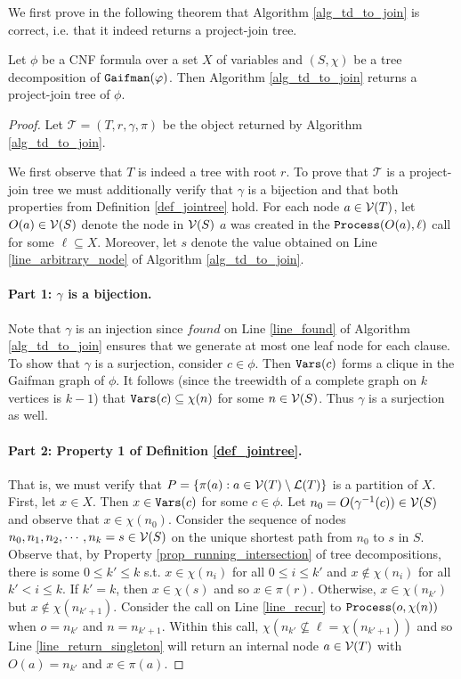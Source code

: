 We first prove in the following theorem that Algorithm \ref{alg_td_to_join} is correct, i.e. that it indeed returns a project-join tree. 
\begin{theorem}
\label{thm_td_to_join_correct}
	Let $\phi$ be a CNF formula over a set $X$ of variables and $(S, \chi)$ be a tree decomposition of $\texttt{\upshape Gaifman}(\varphi)$.
    Then Algorithm \ref{alg_td_to_join} returns a project-join tree of $\phi$.
\end{theorem}
\begin{proof}
Let $\mathcal{T} = (T, r, \gamma, \pi)$ be the object returned by Algorithm \ref{alg_td_to_join}.

We first observe that $T$ is indeed a tree with root $r$. To prove that $\mathcal{T}$ is a project-join tree we must additionally verify that $\gamma$ is a bijection and that both properties from Definition \ref{def_jointree} hold.  For each node $a \in \mathcal{V}(T)$, let $O(a) \in \mathcal{V}(S)$ denote the node in $\mathcal{V}(S)$ \st{} $a$ was created in the $\texttt{\upshape Process}(O(a), \ell)$ call for some $\ell \subseteq X$. Moreover, let $s$ denote the value obtained on Line \ref{line_arbitrary_node} of Algorithm \ref{alg_td_to_join}.

\paragraph{Part 1: $\gamma$ is a bijection.}
    Note that $\gamma$ is an injection since $found$ on Line \ref{line_found} of Algorithm \ref{alg_td_to_join} ensures that we generate at most one leaf node for each clause.
    To show that $\gamma$ is a surjection, consider $c \in \phi$.
    Then $\texttt{\upshape Vars}(c)$ forms a clique in the Gaifman graph of $\phi$.
    It follows (since the treewidth of a complete graph on $k$ vertices is $k-1$) that $\texttt{\upshape Vars}(c) \subseteq \chi(n)$ for some $n \in \mathcal{V}(S)$.
    Thus $\gamma$ is a surjection as well.
    
\paragraph{Part 2: Property 1 of Definition \ref{def_jointree}.} 
    That is, we must verify that $P = \{\pi(a) : a \in \mathcal{V}(T) \setminus \mathcal{L}(T) \}$ is a partition of $X$.
    First, let $x \in X$.
    Then $x \in \texttt{\upshape Vars}(c)$ for some $c \in \phi$. 
    Let $n_0 = O(\gamma^{-1}(c)) \in \mathcal{V}(S)$ and observe that $x \in \chi(n_0)$.
    Consider the sequence of nodes $n_0, n_1, n_2, \cdots, n_k = s \in \mathcal{V}(S)$ on the unique shortest path from $n_0$ to $s$ in $S$.
    Observe that, by Property \ref{prop_running_intersection} of tree decompositions, there is some $0 \leq k' \leq k$ s.t. $x \in \chi(n_i)$ for all $0 \leq i \leq k'$ and $x \not \in \chi(n_i)$ for all $k' < i \leq k$.
    If $k' = k$, then $x \in \chi(s)$ and so $x \in \pi(r)$.
    Otherwise,  $x \in \chi(n_{k'})$ but $x \not\in \chi(n_{k'+1})$.
    Consider the call on Line \ref{line_recur} to $\texttt{\upshape Process}(o, \chi(n))$ when $o = n_{k'}$ and $n = n_{k'+1}$.
    Within this call, $\chi(n_{k'} \not\subseteq \ell = \chi(n_{k'+1}))$ and so Line \ref{line_return_singleton} will return an internal node $a \in \mathcal{V}(T)$ with $O(a) = n_{k'}$ and $x \in \pi(a)$.


\end{proof}
